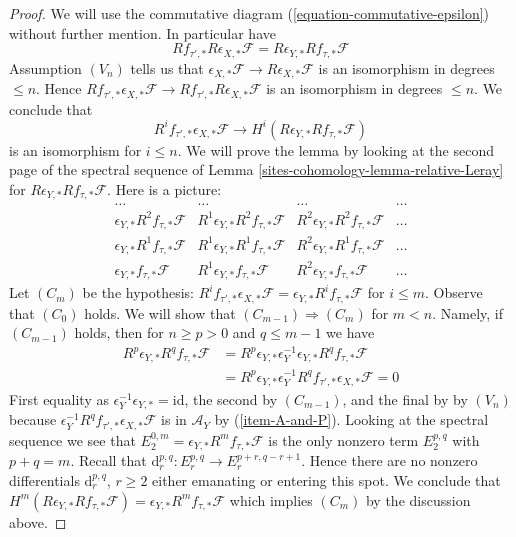 \begin{proof}
We will use the commutative diagram (\ref{equation-commutative-epsilon})
without further mention. In particular have
$$
Rf_{\tau', *}R\epsilon_{X, *}\mathcal{F} =
R\epsilon_{Y, *}Rf_{\tau, *}\mathcal{F}
$$
Assumption $(V_n)$ tells us that
$\epsilon_{X, *}\mathcal{F} \to R\epsilon_{X, *}\mathcal{F}$
is an isomorphism in degrees $\leq n$. Hence
$Rf_{\tau', *}\epsilon_{X, *}\mathcal{F} \to
Rf_{\tau', *}R\epsilon_{X, *}\mathcal{F}$ is an isomorphism
in degrees $\leq n$. We conclude that
$$
R^if_{\tau', *}\epsilon_{X, *}\mathcal{F} \to
H^i(R\epsilon_{Y, *}Rf_{\tau, *}\mathcal{F})
$$
is an isomorphism for $i \leq n$. We will prove the lemma by looking
at the second page of the spectral sequence of
Lemma \ref{sites-cohomology-lemma-relative-Leray}
for $R\epsilon_{Y, *}Rf_{\tau, *}\mathcal{F}$. Here is a picture:
$$
\begin{matrix}
\ldots &
\ldots &
\ldots &
\ldots \\
\epsilon_{Y, *}R^2f_{\tau, *}\mathcal{F} &
R^1\epsilon_{Y, *}R^2f_{\tau, *}\mathcal{F} &
R^2\epsilon_{Y, *}R^2f_{\tau, *}\mathcal{F} &
\ldots \\
\epsilon_{Y, *}R^1f_{\tau, *}\mathcal{F} &
R^1\epsilon_{Y, *}R^1f_{\tau, *}\mathcal{F} &
R^2\epsilon_{Y, *}R^1f_{\tau, *}\mathcal{F} &
\ldots \\
\epsilon_{Y, *}f_{\tau, *}\mathcal{F} &
R^1\epsilon_{Y, *}f_{\tau, *}\mathcal{F} &
R^2\epsilon_{Y, *}f_{\tau, *}\mathcal{F} &
\ldots
\end{matrix}
$$
Let $(C_m)$ be the hypothesis:  $R^if_{\tau', *}\epsilon_{X, *}\mathcal{F} =
\epsilon_{Y, *}R^if_{\tau, *}\mathcal{F}$ for $i \leq m$. Observe that
$(C_0)$ holds. We will show that $(C_{m - 1}) \Rightarrow (C_m)$ for $m < n$.
Namely, if $(C_{m - 1})$ holds, then for
$n \geq p > 0$ and $q \leq m - 1$ we have
\begin{align*}
R^p\epsilon_{Y, *}R^qf_{\tau, *}\mathcal{F}
& =
R^p\epsilon_{Y, *}
\epsilon_Y^{-1} \epsilon_{Y, *} R^qf_{\tau, *}\mathcal{F} \\
& =
R^p\epsilon_{Y, *}
\epsilon_Y^{-1}R^qf_{\tau', *}\epsilon_{X, *}\mathcal{F} = 0
\end{align*}
First equality as $\epsilon_Y^{-1}\epsilon_{Y, *} = \text{id}$,
the second by $(C_{m - 1})$, and the final by
by $(V_n)$ because $\epsilon_Y^{-1}R^qf_{\tau', *}\epsilon_{X, *}\mathcal{F}$
is in $\mathcal{A}_Y$ by (\ref{item-A-and-P}).
Looking at the spectral sequence we see that
$E_2^{0, m} = \epsilon_{Y, *}R^mf_{\tau, *}\mathcal{F}$
is the only nonzero term $E_2^{p, q}$ with $p + q = m$.
Recall that $\text{d}_r^{p, q} : E_r^{p, q} \to E_r^{p + r, q - r + 1}$.
Hence there are no nonzero differentials $\text{d}_r^{p, q}$, $r \geq 2$
either emanating or entering this spot. We conclude that
$H^m(R\epsilon_{Y, *}Rf_{\tau, *}\mathcal{F}) =
\epsilon_{Y, *}R^mf_{\tau, *}\mathcal{F}$ which implies
$(C_m)$ by the discussion above.


\end{proof}
